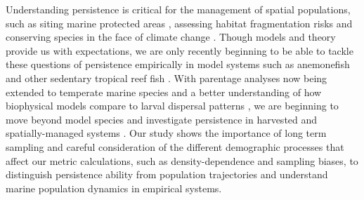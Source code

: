 \documentclass[12pt, oneside]{article}   	%
\begin{document}
Understanding persistence is critical for the management of spatial populations, such as siting marine protected areas \citep[e.g.][]{kaplan_model-based_2009}, assessing habitat fragmentation risks \citep[e.g.][]{smith2002population, fahrig2001much} and conserving species in the face of climate change \citep[e.g.][]{coleman2017anticipating, fuller2015persistence}. Though models and theory provide us with expectations, we are only recently beginning to be able to tackle these questions of persistence empirically in model systems such as anemonefish and other sedentary tropical reef fish \citep[e.g.][]{salles_coral_2015,johnson2018integrating}. With parentage analyses now being extended to temperate marine species \citep[e.g.][]{baetscher2019dispersal} and a better understanding of how biophysical models compare to larval dispersal patterns \citep{bode2019validation}, we are beginning to move beyond model species and investigate persistence in harvested and spatially-managed systems \citep[e.g.][]{garavelli2018population}. Our study shows the importance of long term sampling and careful consideration of the different demographic processes that affect our metric calculations, such as density-dependence and sampling biases, to distinguish persistence ability from population trajectories and understand marine population dynamics in empirical systems.


\end{document}

